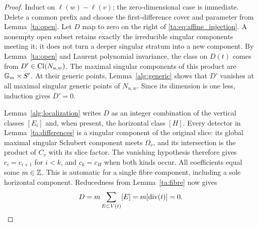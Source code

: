 \begin{proof}
Induct on $\ell(w)-\ell(v)$; the zero-dimensional case is immediate.
Delete a common prefix and choose the first-difference cover and
parameter from Lemma~\ref{ta:open}.
Let $D$ map to zero on the right of \eqref{ta:eq:affine_injection}.
A nonempty open subset retains exactly the irreducible singular
components meeting it; it does not turn a deeper singular stratum
into a new component. By Lemma~\ref{ta:open} and Laurent
polynomial invariance, the class on $D(t)$ comes from
$D'\in\operatorname{Cl}(N_{u,w})$. The maximal singular components of this
product are $\mathbb G_m\times S'$. At their generic points,
Lemma~\ref{alg:generic} shows that $D'$ vanishes at all maximal
singular generic points of $N_{u,w}$. Since its dimension is one less,
induction gives $D'=0$.

Lemma~\ref{alg:localization} writes $D$ as an integer combination of
the vertical classes $[E_i]$ and, when present, the horizontal class
$[H]$. Every detector in
Lemma~\ref{ta:differences} is a singular component of the original
slice: its global maximal singular Schubert component meets
$\Omega_v$, and its intersection is the product of $C_v$ with
its slice factor. The vanishing hypothesis therefore gives
$c_i=c_{i+1}$ for $i<k$, and $c_k=c_H$ when both kinds occur.
All coefficients equal some $m\in\mathbb Z$.
This is automatic for a single fibre component, including a sole
horizontal component. Reducedness from Lemma~\ref{ta:fibre} now gives
\[
 D=m\sum_{E\subset V(t)}[E]=m[\operatorname{div}(t)]=0.\qedhere
\]
\end{proof}

